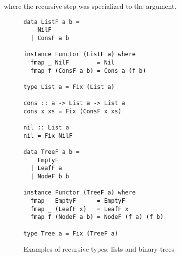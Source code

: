 where the recursive step was specialized to the  argument.

\begin{figure}
\begin{verbatim}
data ListF a b =
    NilF
  | ConsF a b
  
instance Functor (ListF a) where
  fmap _ NilF        = Nil
  fmap f (ConsF a b) = Cons a (f b)

type List a = Fix (List a)

cons :: a -> List a -> List a
cons x xs = Fix (ConsF x xs)

nil :: List a
nil = Fix NilF

data TreeF a b =
    EmptyF
  | LeafF a
  | NodeF b b

instance Functor (TreeF a) where
  fmap _ EmptyF      = EmptyF
  fmap _ (LeafF x)   = LeafF x
  fmap f (NodeF a b) = NodeF (f a) (f b)

type Tree a = Fix (TreeF a)
\end{verbatim}
\label{fig:listtree}
\caption{Examples of recursive types: lists and binary trees}
\end{figure}